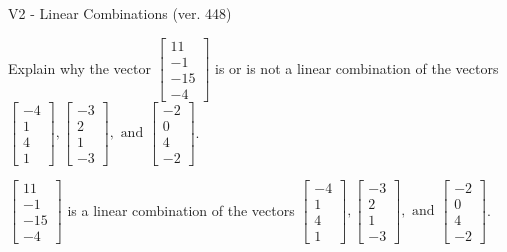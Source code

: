 \begin{exercise}
  \begin{exerciseTitle}V2 - Linear Combinations (ver. 448)\end{exerciseTitle}
  \begin{exerciseStatement}
    Explain why the vector \(\left[\begin{array}{c}
11 \\
-1 \\
-15 \\
-4
\end{array}\right]\)  is or is not a linear 
	combination of the vectors \(\left[\begin{array}{c}
-4 \\
1 \\
4 \\
1
\end{array}\right] , \left[\begin{array}{c}
-3 \\
2 \\
1 \\
-3
\end{array}\right] , \text{ and } \left[\begin{array}{c}
-2 \\
0 \\
4 \\
-2
\end{array}\right]\).
	


  \end{exerciseStatement}
  \begin{exerciseAnswer}
   \(\left[\begin{array}{c}
11 \\
-1 \\
-15 \\
-4
\end{array}\right]\) 
  	 is  
	a linear combination of the vectors \(\left[\begin{array}{c}
-4 \\
1 \\
4 \\
1
\end{array}\right] , \left[\begin{array}{c}
-3 \\
2 \\
1 \\
-3
\end{array}\right] , \text{ and } \left[\begin{array}{c}
-2 \\
0 \\
4 \\
-2
\end{array}\right]\).

	
  


  \end{exerciseAnswer}
\end{exercise}